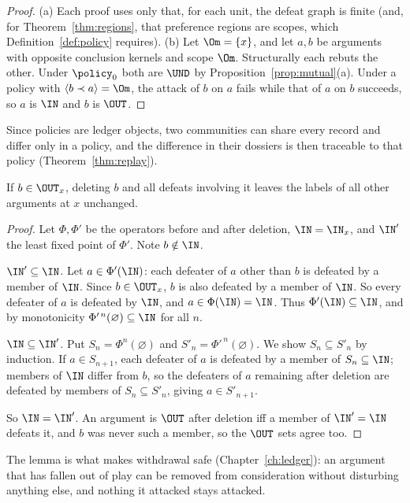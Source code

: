 \begin{proof}
(a) Each proof uses only that, for each unit, the defeat graph is finite (and, for Theorem~\ref{thm:regions}, that preference regions are scopes, which Definition~\ref{def:policy} requires).
(b) Let $\Om=\{x\}$, and let $a,b$ be arguments with opposite conclusion kernels and scope $\Om$. Structurally each rebuts the other. Under $\policy_0$ both are $\UND$ by Proposition~\ref{prop:mutual}(a). Under a policy with $\langle b\prec a\rangle=\Om$, the attack of $b$ on $a$ fails while that of $a$ on $b$ succeeds, so $a$ is $\IN$ and $b$ is $\OUT$.
\end{proof}

Since policies are ledger objects, two communities can share every record and differ only in a policy, and the difference in their dossiers is then traceable to that policy (Theorem~\ref{thm:replay}).

\begin{lemma}\label{lem:outinert}
If $b\in\OUT_x$, deleting $b$ and all defeats involving it leaves the labels of all other arguments at $x$ unchanged.
\end{lemma}

\begin{proof}
Let $\Phi,\Phi'$ be the operators before and after deletion, $\IN=\IN_x$, and $\IN'$ the least fixed point of $\Phi'$. Note $b\notin\IN$.

\emph{$\IN'\subseteq\IN$.} Let $a\in\Phi'(\IN)$: each defeater of $a$ other than $b$ is defeated by a member of $\IN$. Since $b\in\OUT_x$, $b$ is also defeated by a member of $\IN$. So every defeater of $a$ is defeated by $\IN$, and $a\in\Phi(\IN)=\IN$. Thus $\Phi'(\IN)\subseteq\IN$, and by monotonicity $\Phi'^{\,n}(\varnothing)\subseteq\IN$ for all $n$.

\emph{$\IN\subseteq\IN'$.} Put $S_n=\Phi^n(\varnothing)$ and $S'_n=\Phi'^{\,n}(\varnothing)$. We show $S_n\subseteq S'_n$ by induction. If $a\in S_{n+1}$, each defeater of $a$ is defeated by a member of $S_n\subseteq\IN$; members of $\IN$ differ from $b$, so the defeaters of $a$ remaining after deletion are defeated by members of $S_n\subseteq S'_n$, giving $a\in S'_{n+1}$.

So $\IN=\IN'$. An argument is $\OUT$ after deletion iff a member of $\IN'=\IN$ defeats it, and $b$ was never such a member, so the $\OUT$ sets agree too.
\end{proof}

The lemma is what makes withdrawal safe (Chapter~\ref{ch:ledger}): an argument that has fallen out of play can be removed from consideration without disturbing anything else, and nothing it attacked stays attacked.

